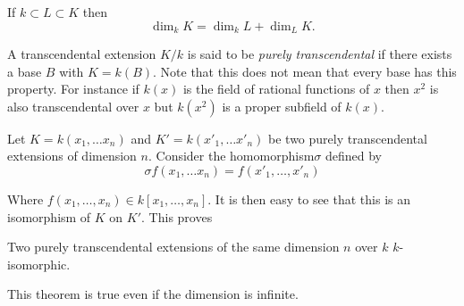 \begin{thm}\label{c1:thm10}%
If $ k \subset L \subset K $ then
 $$
 \dim_k K = \dim_k L + \dim_L K.
 $$
 \end{thm} 
 
 A transcendental extension  $ K /k $ is  said to be \textit{purely
   transcendental} if  there exists a base $B$  with $K = k (B)$. Note
 that this does not mean that every base has this property. For
 instance  if $k(x)$ is the field of rational functions of $x$  then
 $x^2$  is also transcendental over $x$ but $k (x^2)$  is a proper
 subfield of $k(x)$. 
 
 Let $K = k (x_1, \ldots x_n)$ and $ K' = k ( x'_1, \ldots x'_n ) $
 be two purely transcendental extensions of dimension $n$. Consider
 the  homomorphism\pageoriginale $\sigma$ defined by   
$$
\sigma f (x_1 , \ldots x_n ) = f ( x'_1 , \ldots , x'_n)
$$

Where $ f ( x_1 ,\ldots , x_n )  \in k [x_1 ,\ldots , x_n ] $. It is 
then easy to see that this is an  isomorphism of $K$ on $K'$. This
proves  

\begin{thm}%
Two purely transcendental extensions of the same dimension $n$
 over $k$  $k$-isomorphic. 
\end{thm}

This theorem is true even if the  dimension is infinite. 


